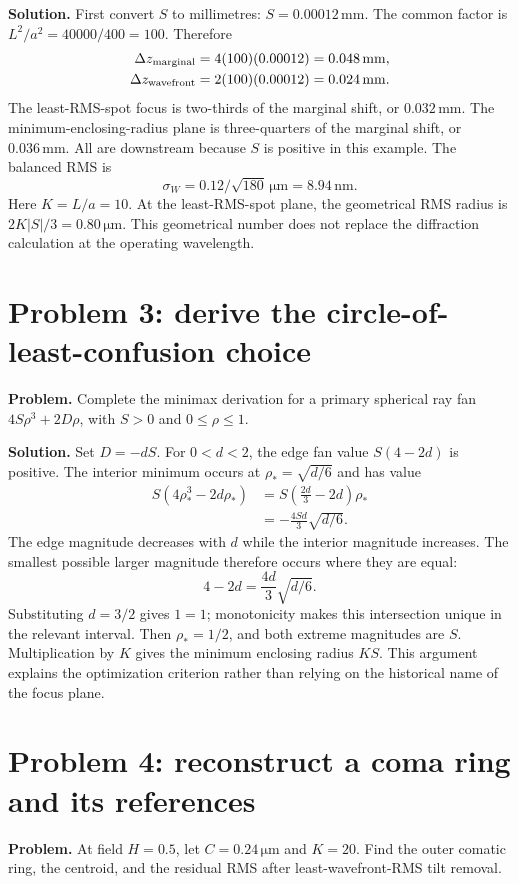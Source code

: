 \textbf{Solution.} First convert $S$ to millimetres:
$S=0.00012\,\mathrm{mm}$. The common factor is
$L^2/a^2=40000/400=100$. Therefore
\begin{align}
 \Delta z_{\rm marginal}&=4(100)(0.00012)=0.048\,\mathrm{mm},\\
 \Delta z_{\rm wavefront}&=2(100)(0.00012)=0.024\,\mathrm{mm}.
\end{align}
The least-RMS-spot focus is two-thirds of the marginal shift, or
$0.032\,\mathrm{mm}$. The minimum-enclosing-radius plane is three-quarters
of the marginal shift, or $0.036\,\mathrm{mm}$. All are downstream because
$S$ is positive in this example. The balanced RMS is
\begin{equation}
 \sigma_W=0.12/\sqrt{180}\,\mathrm{\mu m}
         =8.94\,\mathrm{nm}.
\end{equation}
Here $K=L/a=10$. At the least-RMS-spot plane, the geometrical RMS radius is
$2K|S|/3=0.80\,\mathrm{\mu m}$. This geometrical number does not replace
the diffraction calculation at the operating wavelength.

\section{Problem 3: derive the circle-of-least-confusion choice}
\textbf{Problem.} Complete the minimax derivation for a primary spherical ray
fan $4S\rho^3+2D\rho$, with $S>0$ and $0\leq\rho\leq1$.

\textbf{Solution.} Set $D=-dS$. For $0<d<2$, the edge fan value
$S(4-2d)$ is positive. The interior minimum occurs at
$\rho_* =\sqrt{d/6}$ and has value
\begin{align}
 S(4\rho_*^3-2d\rho_*)
 &=S\left(\frac{2d}{3}-2d\right)\rho_*\\
 &=-\frac{4Sd}{3}\sqrt{d/6}.
\end{align}
The edge magnitude decreases with $d$ while the interior magnitude increases.
The smallest possible larger magnitude therefore occurs where they are
equal:
\begin{equation}
 4-2d=\frac{4d}{3}\sqrt{d/6}.
\end{equation}
Substituting $d=3/2$ gives $1=1$; monotonicity makes this intersection unique
in the relevant interval. Then $\rho_*=1/2$, and both extreme magnitudes
are $S$. Multiplication by $K$ gives the minimum enclosing radius $KS$.
This argument explains the optimization criterion rather than relying on
the historical name of the focus plane.

\section{Problem 4: reconstruct a coma ring and its references}
\textbf{Problem.} At field $H=0.5$, let $C=0.24\,\mathrm{\mu m}$ and
$K=20$. Find the outer comatic ring, the centroid, and the residual RMS
after least-wavefront-RMS tilt removal.


